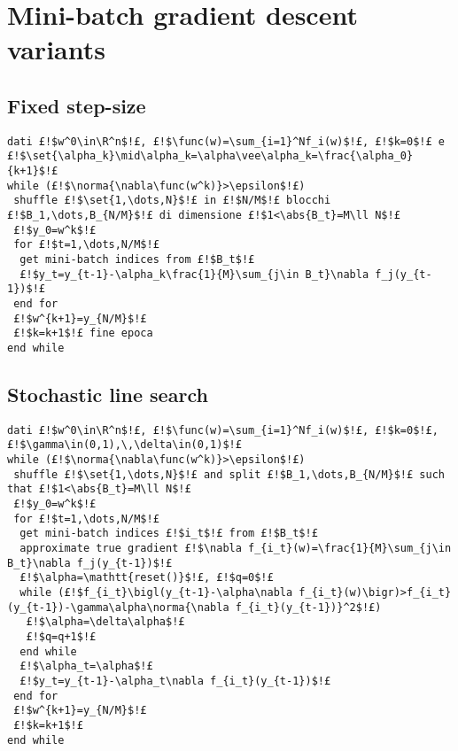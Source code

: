 \section{Mini-batch gradient descent variants}

\subsection{Fixed step-size}

\begin{lstlisting}[style=simple,title={Mini-batch Gradient Descent with fixed or decreasing step-size}]
dati £!$w^0\in\R^n$!£, £!$\func(w)=\sum_{i=1}^Nf_i(w)$!£, £!$k=0$!£ e £!$\set{\alpha_k}\mid\alpha_k=\alpha\vee\alpha_k=\frac{\alpha_0}{k+1}$!£
while (£!$\norma{\nabla\func(w^k)}>\epsilon$!£)
 shuffle £!$\set{1,\dots,N}$!£ in £!$N/M$!£ blocchi £!$B_1,\dots,B_{N/M}$!£ di dimensione £!$1<\abs{B_t}=M\ll N$!£
 £!$y_0=w^k$!£
 for £!$t=1,\dots,N/M$!£
  get mini-batch indices from £!$B_t$!£
  £!$y_t=y_{t-1}-\alpha_k\frac{1}{M}\sum_{j\in B_t}\nabla f_j(y_{t-1})$!£
 end for
 £!$w^{k+1}=y_{N/M}$!£
 £!$k=k+1$!£ fine epoca
end while
\end{lstlisting}


\subsection{Stochastic line search}

\begin{lstlisting}[style=simple,title={Mini-batch Gradient Descent with Armijo line search}]
dati £!$w^0\in\R^n$!£, £!$\func(w)=\sum_{i=1}^Nf_i(w)$!£, £!$k=0$!£, £!$\gamma\in(0,1),\,\delta\in(0,1)$!£
while (£!$\norma{\nabla\func(w^k)}>\epsilon$!£)
 shuffle £!$\set{1,\dots,N}$!£ and split £!$B_1,\dots,B_{N/M}$!£ such that £!$1<\abs{B_t}=M\ll N$!£
 £!$y_0=w^k$!£
 for £!$t=1,\dots,N/M$!£
  get mini-batch indices £!$i_t$!£ from £!$B_t$!£
  approximate true gradient £!$\nabla f_{i_t}(w)=\frac{1}{M}\sum_{j\in B_t}\nabla f_j(y_{t-1})$!£
  £!$\alpha=\mathtt{reset()}$!£, £!$q=0$!£
  while (£!$f_{i_t}\bigl(y_{t-1}-\alpha\nabla f_{i_t}(w)\bigr)>f_{i_t}(y_{t-1})-\gamma\alpha\norma{\nabla f_{i_t}(y_{t-1})}^2$!£)
   £!$\alpha=\delta\alpha$!£
   £!$q=q+1$!£
  end while
  £!$\alpha_t=\alpha$!£
  £!$y_t=y_{t-1}-\alpha_t\nabla f_{i_t}(y_{t-1})$!£
 end for
 £!$w^{k+1}=y_{N/M}$!£
 £!$k=k+1$!£
end while
\end{lstlisting}



















